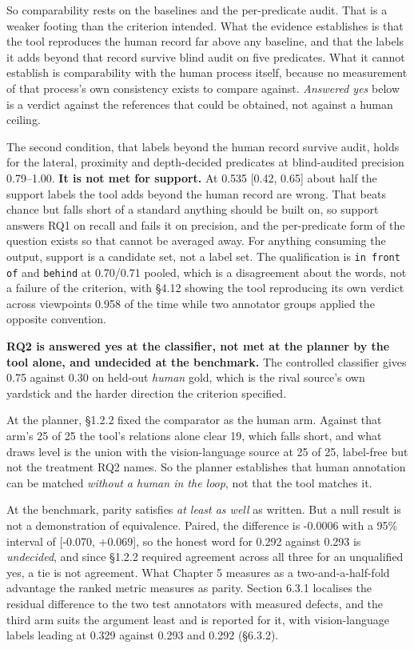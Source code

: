 So comparability rests on the baselines and the per-predicate audit. That is a weaker footing than the criterion intended. What the evidence establishes is that the tool reproduces the human record far above any baseline, and that the labels it adds beyond that record survive blind audit on five predicates. What it cannot establish is comparability with the human process itself, because no measurement of that process's own consistency exists to compare against. \textit{Answered yes} below is a verdict against the references that could be obtained, not against a human ceiling.

The second condition, that labels beyond the human record survive audit, holds for the lateral, proximity and depth-decided predicates at blind-audited precision 0.79--1.00. \textbf{It is not met for support.} At 0.535 [0.42, 0.65] about half the support labels the tool adds beyond the human record are wrong. That beats chance but falls short of a standard anything should be built on, so support answers RQ1 on recall and fails it on precision, and the per-predicate form of the question exists so that cannot be averaged away. For anything consuming the output, support is a candidate set, not a label set. The qualification is \texttt{in front of} and \texttt{behind} at 0.70/0.71 pooled, which is a disagreement about the words, not a failure of the criterion, with \S{}4.12 showing the tool reproducing its own verdict across viewpoints 0.958 of the time while two annotator groups applied the opposite convention.

\textbf{RQ2 is answered yes at the classifier, not met at the planner by the tool alone, and undecided at the benchmark.} The controlled classifier gives 0.75 against 0.30 on held-out \textit{human} gold, which is the rival source's own yardstick and the harder direction the criterion specified.

At the planner, \S{}1.2.2 fixed the comparator as the human arm. Against that arm's 25 of 25 the tool's relations alone clear 19, which falls short, and what draws level is the union with the vision-language source at 25 of 25, label-free but not the treatment RQ2 names. So the planner establishes that human annotation can be matched \textit{without a human in the loop}, not that the tool matches it.

At the benchmark, parity satisfies \textit{at least as well} as written. But a null result is not a demonstration of equivalence. Paired, the difference is -0.0006 with a 95\% interval of [-0.070, +0.069], so the honest word for 0.292 against 0.293 is \textit{undecided}, and since \S{}1.2.2 required agreement across all three for an unqualified yes, a tie is not agreement. What Chapter 5 measures as a two-and-a-half-fold advantage the ranked metric measures as parity. Section 6.3.1 localises the residual difference to the two test annotators with measured defects, and the third arm suits the argument least and is reported for it, with vision-language labels leading at 0.329 against 0.293 and 0.292 (\S{}6.3.2).

